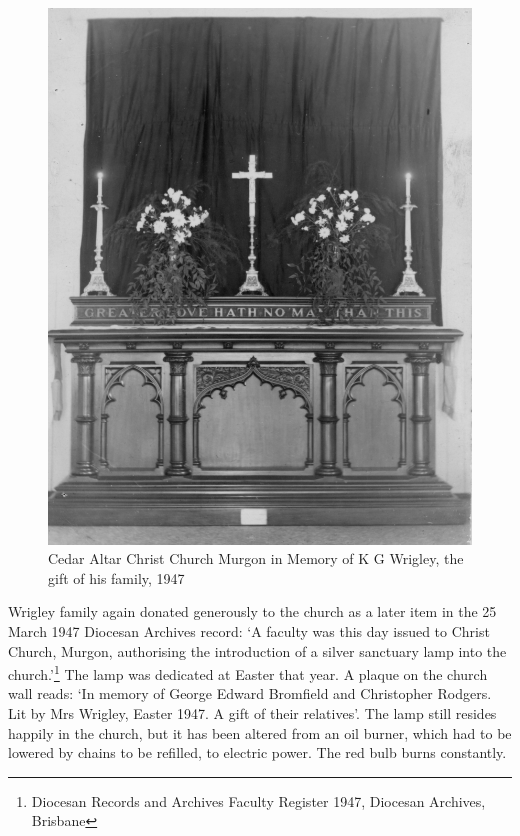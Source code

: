 \begin{figure}
\begin{center}
\includegraphics[width=1.\linewidth,center]{../images/cedarAltar1947.jpg}
\caption{Cedar Altar Christ Church Murgon in Memory of K G Wrigley, the gift of his family, 1947}
\end{center}
\end{figure}




Wrigley family again donated generously to the church as a later item in the 25 March 1947 Diocesan Archives record: `A faculty was this day issued to Christ Church, Murgon, authorising the introduction of a silver sanctuary lamp into the church.'\footnote{Diocesan Records and Archives Faculty Register 1947, Diocesan Archives, Brisbane} The lamp was dedicated at Easter that year. A plaque on the church wall reads: `In memory of George Edward Bromfield and Christopher Rodgers. Lit by Mrs Wrigley, Easter 1947. A gift of their relatives'. The lamp still resides happily in the church, but it has been altered from an oil burner, which had to be lowered by chains to be refilled, to electric power. The red bulb burns constantly.


